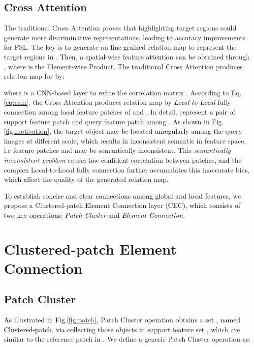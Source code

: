 \documentclass{article}
\newcommand{\ljx}[1]{\textcolor{black}{#1}}
\newcommand{\seasons}[1]{\textcolor{black}{#1}}
\begin{document}
\subsection{Cross Attention}
The traditional Cross Attention \cite{hou2019cross} proves that highlighting target regions \seasons{could} generate more discriminative representations, leading to accuracy improvements for FSL.
The key is \seasons{to generate} an \seasons{fine-grained} relation map  \seasons{to represent} the target regions \seasons{in} .
\seasons{Then, a spatial-wise feature attention can be obtained} through , where  is the Element-wise Product.
The traditional Cross Attention produces relation map  for  by:
\begin{small}

\end{small}where  is a CNN-based layer to refine the correlation matrix .
According to Eq.\ref{eq:cam}, the Cross Attention produces relation map by \seasons{\emph{Local-to-Local}} fully connection among local feature patches of  and .
In detail,  represent \seasons{a pair of} support feature patch and query feature patch among  .
As shown in Fig.\ref{fig:motivation}, the target object may be located \seasons{unregularly} among the query images at different scale, which results in inconsistent semantic in feature space, i.e feature patches  and  may be semantically inconsistent.
This \emph{semantically inconsistent problem} causes low confident correlation between patches, and the complex Local-to-Local fully connection further accumulates this inaccurate bias, which affect the quality of the generated relation map.

\seasons{To establish concise and clear connections among global and local features}, we propose a Clustered-patch Element Connection layer (CEC), \seasons{which consists of two key operations: \emph{Patch Cluster} and \emph{Element Connection}.}


\section{Clustered-patch Element Connection}\label{Clustered-patch_Element_Connection}
\subsection{Patch Cluster}
\ljx{As illustrated in Fig.\ref{fig:patch}}, Patch Cluster \seasons{operation} \ljx{obtains} a set \ljx{}, \seasons{named Clustered-patch}, \ljx{via collecting} those objects in support feature set , which are similar to the reference patch in .
We define a generic Patch Cluster operation  as:
\end{document}
